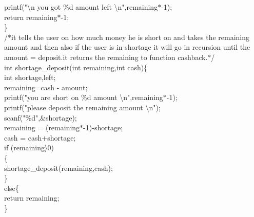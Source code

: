 \documentclass[10pt,a4paper]{article}
\begin{document}
\begin{flushleft}
    \hspace*{0.5cm}  printf("\textbackslash n you got \%d amount left \textbackslash n",remaining$\ast$-1);\\
    \hspace*{0.5cm}  return remaining$\ast$-1;\\
\}\\
/$\ast$it tells the user on how much money he is short on and takes the remaining amount and then also if the user is in shortage 
it will go in recursion until the amount = deposit.it returns the remaining to function cashback.$\ast$/\\
int shortage\_deposit(int remaining,int cash)\{\\
    \hspace*{0.5cm}  int shortage,left;\\
    \hspace*{0.5cm}  remaining=cash - amount;\\
    \hspace*{0.5cm}  printf("you are short on \%d amount \textbackslash n",remaining$\ast$-1);\\
    \hspace*{0.5cm}  printf("please deposit the remaining amount \textbackslash n");\\
    \hspace*{0.5cm}  scanf("\%d",\&shortage);\\
    \hspace*{0.5cm}  remaining = (remaining$\ast$-1)-shortage;\\
    \hspace*{0.5cm}  cash = cash+shortage;\\
    \hspace*{0.5cm}  if (remaining$\rangle$0)\\
    \hspace*{0.5cm}  \{\\
    \hspace*{0.5cm}  \hspace*{0.5cm}shortage\_deposit(remaining,cash);\\
    \hspace*{0.5cm}  \}\\
    \hspace*{0.5cm}  else\{\\
    \hspace*{0.5cm}  \hspace*{0.5cm}return remaining;\\
    \hspace*{0.5cm}  \}\\

\end{flushleft}
\end{document}
